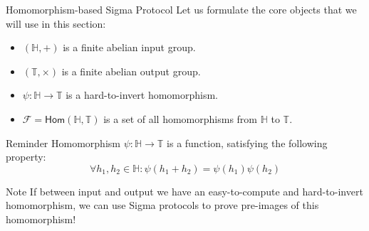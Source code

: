 \documentclass[xcolor={usenames,dvipsnames}]{beamer}
\begin{document}
    \begin{frame}{Homomorphism-based Sigma Protocol}
        Let us formulate the core objects that we will use in this section:\pause
        \begin{itemize}
            \item $(\mathbb{H}, +)$ is a finite abelian input group.\pause
            \item $(\mathbb{T}, \times)$ is a finite abelian output group.\pause
            \item $\psi: \mathbb{H} \to \mathbb{T}$ is a hard-to-invert homomorphism.\pause
            \item $\mathcal{F} = \mathsf{Hom}(\mathbb{H}, \mathbb{T})$ is a set of all homomorphisms from $\mathbb{H}$ to $\mathbb{T}$.\pause
        \end{itemize}

        \begin{block}{Reminder}
            Homomorphism $\psi: \mathbb{H} \to \mathbb{T}$ is a function, satisfying the following property:
            \begin{equation*}
                \forall h_1, h_2 \in \mathbb{H}: \psi(h_1 + h_2) = \psi(h_1)\psi(h_2)
            \end{equation*}
        \end{block}

        \pause\begin{alertblock}{Note}
            If between input and output we have an easy-to-compute and hard-to-invert homomorphism, we can use Sigma protocols to prove pre-images of this homomorphism!
        \end{alertblock}
    \end{frame}
\end{document}
